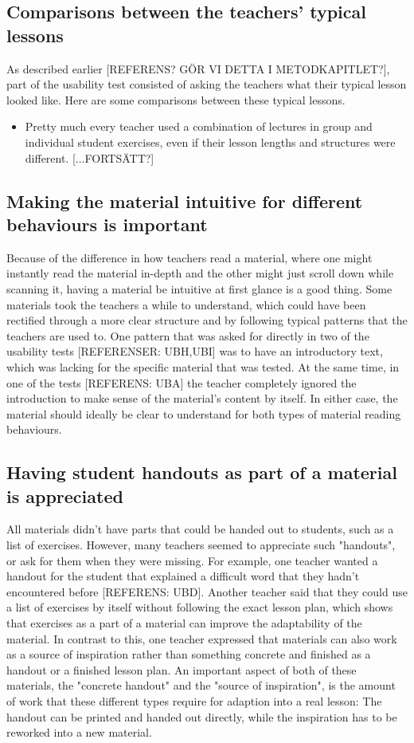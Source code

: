 \subsection{Comparisons between the teachers' typical lessons}
As described earlier [REFERENS? GÖR VI DETTA I METODKAPITLET?], part of the usability test consisted of asking the teachers what their typical lesson looked like. Here are some comparisons between these typical lessons.

\begin{itemize}
  \item Pretty much every teacher used a combination of lectures in group and individual student exercises, even if their lesson lengths and structures were different. [...FORTSÄTT?]
\end{itemize}

\subsection{Making the material intuitive for different behaviours is important}
Because of the difference in how teachers read a material, where one might instantly read the material in-depth and the other might just scroll down while scanning it, having a material be intuitive at first glance is a good thing. Some materials took the teachers a while to understand, which could have been rectified through a more clear structure and by following typical patterns that the teachers are used to. One pattern that was asked for directly in two of the usability tests [REFERENSER: UBH,UBI] was to have an introductory text, which was lacking for the specific material that was tested. At the same time, in one of the tests [REFERENS: UBA] the teacher completely ignored the introduction to make sense of the material's content by itself. In either case, the material should ideally be clear to understand for both types of material reading behaviours.

\subsection{Having student handouts as part of a material is appreciated}
All materials didn't have parts that could be handed out to students, such as a list of exercises. However, many teachers seemed to appreciate such "handouts", or ask for them when they were missing. For example, one teacher wanted a handout for the student that explained a difficult word that they hadn't encountered before [REFERENS: UBD]. Another teacher said that they could use a list of exercises by itself without following the exact lesson plan, which shows that exercises as a part of a material can improve the adaptability of the material. In contrast to this, one teacher expressed that materials can also work as a source of inspiration rather than something concrete and finished as a handout or a finished lesson plan. An important aspect of both of these materials, the "concrete handout" and the "source of inspiration", is the amount of work that these different types require for adaption into a real lesson: The handout can be printed and handed out directly, while the inspiration has to be reworked into a new material.

